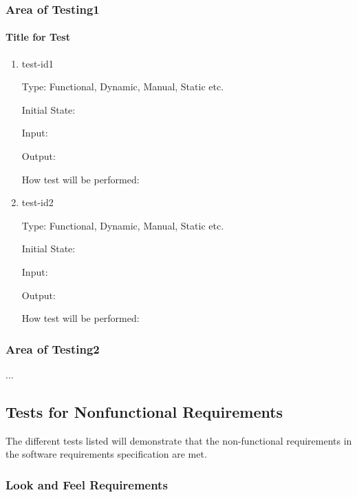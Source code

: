 \documentclass[12pt, titlepage]{article}
\begin{document}
\subsubsection{Area of Testing1}
		
\paragraph{Title for Test}

\begin{enumerate}

\item{test-id1\\}

Type: Functional, Dynamic, Manual, Static etc.
					
Initial State: 
					
Input: 
					
Output: 
					
How test will be performed: 
					
\item{test-id2\\}

Type: Functional, Dynamic, Manual, Static etc.
					
Initial State: 
					
Input: 
					
Output: 
					
How test will be performed: 

\end{enumerate}

\subsubsection{Area of Testing2}

...

\subsection{Tests for Nonfunctional Requirements}
The different tests listed will demonstrate that the non-functional requirements in the software requirements specification are met.

\subsubsection{Look and Feel Requirements}
\end{document}
